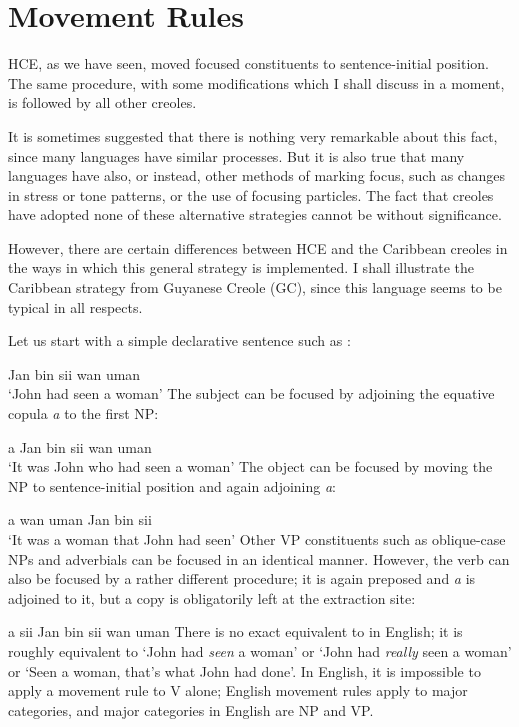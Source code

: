 \section{Movement Rules}

HCE, as we have seen, moved focused constituents to sentence-initial position. The same procedure, with some modifications which I shall discuss in a moment, is followed by all other creoles.

It is sometimes suggested that there is nothing very remarkable about this fact, since many languages have similar processes. But it is also true that many languages have also, or instead, other methods of marking focus, such as changes in stress or tone patterns, or the use of focusing particles. The fact that creoles have adopted none of these alternative strategies cannot be without significance.


However, there are certain differences between HCE and the Caribbean creoles in the ways in which this general strategy is imple\-mented. I shall illustrate the Caribbean strategy from Guyanese Creole (GC), since this language seems to be typical in all respects.

Let us start with a simple declarative sentence such as :

\ea\label{ex:2:1}
 Jan bin sii wan uman \\
\glt `John had seen a woman'
\z %
The subject can be focused by adjoining the equative copula \textit{a} to the first NP:

\ea\label{ex:2:2}
 a Jan bin sii wan uman\\
\glt `It was John who had seen a woman'
\z
The object can be focused by moving the NP to sentence-initial position and again adjoining \textit{a}:

\ea\label{ex:2:3}
 a wan uman Jan bin sii \\
\glt `It was a woman that John had seen'
\z
Other VP constituents such as oblique-case NPs and adverbials can be focused in an identical manner. However, the verb can also be focused by a rather different procedure; it is again preposed and \textit{a} is adjoined to it, but a copy is obligatorily left at the extraction site:

\ea\label{ex:2:4}
 a sii Jan bin sii wan uman
\z
There is no exact equivalent to  in English; it is roughly equivalent to `John had \textit{seen} a woman' or `John had \textit{really} seen a woman' or `Seen a woman, that's what John had done'. In English, it is impossible to apply a movement rule to V alone; English movement rules apply to major categories, and major categories in English are NP and VP.

